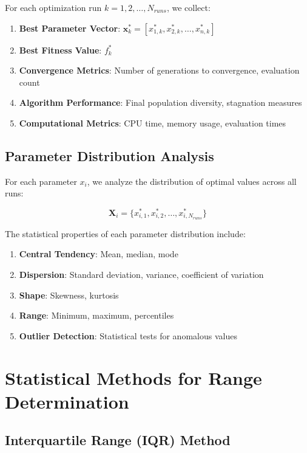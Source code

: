 \documentclass[../main.tex]{subfiles}
\begin{document}
For each optimization run $k = 1, 2, \dots, N_{runs}$, we collect:

\begin{enumerate}
    \item \textbf{Best Parameter Vector}: $\mathbf{x}_k^* = [x_{1,k}^*, x_{2,k}^*, \dots, x_{n,k}^*]$
    \item \textbf{Best Fitness Value}: $f_k^*$
    \item \textbf{Convergence Metrics}: Number of generations to convergence, evaluation count
    \item \textbf{Algorithm Performance}: Final population diversity, stagnation measures
    \item \textbf{Computational Metrics}: CPU time, memory usage, evaluation times
\end{enumerate}

\subsection{Parameter Distribution Analysis}

For each parameter $x_i$, we analyze the distribution of optimal values across all runs:

\begin{equation}
\mathbf{X}_i = \{x_{i,1}^*, x_{i,2}^*, \dots, x_{i,N_{runs}}^*\}
\label{eq:param_distribution}
\end{equation}

The statistical properties of each parameter distribution include:

\begin{enumerate}
    \item \textbf{Central Tendency}: Mean, median, mode
    \item \textbf{Dispersion}: Standard deviation, variance, coefficient of variation
    \item \textbf{Shape}: Skewness, kurtosis
    \item \textbf{Range}: Minimum, maximum, percentiles
    \item \textbf{Outlier Detection}: Statistical tests for anomalous values
\end{enumerate}

\section{Statistical Methods for Range Determination}

\subsection{Interquartile Range (IQR) Method}
\end{document}
